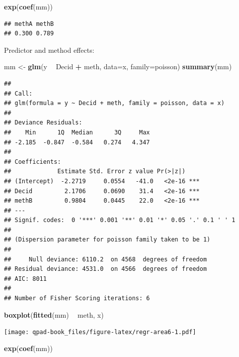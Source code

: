 \documentclass[12pt,]{book}
\newenvironment{Shaded}{\begin{snugshade}}{\end{snugshade}}
\newcommand{\DataTypeTok}[1]{\textcolor[rgb]{0.13,0.29,0.53}{#1}}
\newcommand{\KeywordTok}[1]{\textcolor[rgb]{0.13,0.29,0.53}{\textbf{#1}}}
\newcommand{\NormalTok}[1]{#1}
\newcommand{\OperatorTok}[1]{\textcolor[rgb]{0.81,0.36,0.00}{\textbf{#1}}}
\newcommand{\StringTok}[1]{\textcolor[rgb]{0.31,0.60,0.02}{#1}}
\begin{document}
\begin{Shaded}
\begin{Highlighting}[]
\KeywordTok{exp}\NormalTok{(}\KeywordTok{coef}\NormalTok{(mm))}
\end{Highlighting}
\end{Shaded}

\begin{verbatim}
## methA methB 
## 0.300 0.789
\end{verbatim}

Predictor and method effects:

\begin{Shaded}
\begin{Highlighting}[]
\NormalTok{mm <-}\StringTok{ }\KeywordTok{glm}\NormalTok{(y }\OperatorTok{~}\StringTok{ }\NormalTok{Decid }\OperatorTok{+}\StringTok{ }\NormalTok{meth, }\DataTypeTok{data=}\NormalTok{x, }\DataTypeTok{family=}\NormalTok{poisson)}
\KeywordTok{summary}\NormalTok{(mm)}
\end{Highlighting}
\end{Shaded}

\begin{verbatim}
## 
## Call:
## glm(formula = y ~ Decid + meth, family = poisson, data = x)
## 
## Deviance Residuals: 
##    Min      1Q  Median      3Q     Max  
## -2.185  -0.847  -0.584   0.274   4.347  
## 
## Coefficients:
##             Estimate Std. Error z value Pr(>|z|)    
## (Intercept)  -2.2719     0.0554   -41.0   <2e-16 ***
## Decid         2.1706     0.0690    31.4   <2e-16 ***
## methB         0.9804     0.0445    22.0   <2e-16 ***
## ---
## Signif. codes:  0 '***' 0.001 '**' 0.01 '*' 0.05 '.' 0.1 ' ' 1
## 
## (Dispersion parameter for poisson family taken to be 1)
## 
##     Null deviance: 6110.2  on 4568  degrees of freedom
## Residual deviance: 4531.0  on 4566  degrees of freedom
## AIC: 8011
## 
## Number of Fisher Scoring iterations: 6
\end{verbatim}

\begin{Shaded}
\begin{Highlighting}[]
\KeywordTok{boxplot}\NormalTok{(}\KeywordTok{fitted}\NormalTok{(mm) }\OperatorTok{~}\StringTok{ }\NormalTok{meth, x)}
\end{Highlighting}
\end{Shaded}

\texttt{[image: qpad-book\_files/figure-latex/regr-area6-1.pdf]}

\begin{Shaded}
\begin{Highlighting}[]
\KeywordTok{exp}\NormalTok{(}\KeywordTok{coef}\NormalTok{(mm))}
\end{Highlighting}
\end{Shaded}
\end{document}

